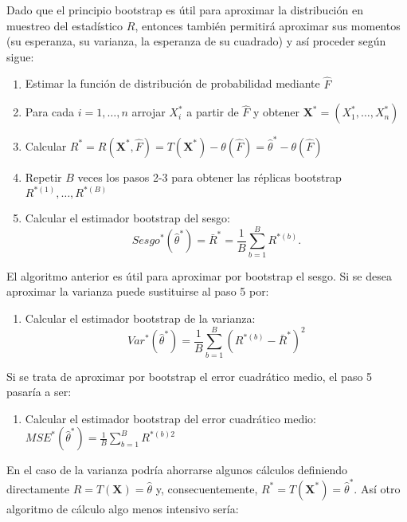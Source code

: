 \documentclass[
]{book}
\providecommand{\tightlist}{%
  \setlength{\itemsep}{0pt}\setlength{\parskip}{0pt}}
\theoremstyle{break}
\theoremstyle{definition}
\theoremstyle{definition}
\theoremstyle{definition}
\theoremstyle{remark}
\begin{document}
Dado que el principio bootstrap es útil para aproximar la distribución
en muestreo del estadístico \(R\), entonces también permitirá aproximar
sus momentos (su esperanza, su varianza, la esperanza de su cuadrado) y
así proceder según sigue:

\begin{enumerate}
\def\labelenumi{\arabic{enumi}.}
\item
  Estimar la función de distribución de probabilidad mediante \(\hat{F}\)
\item
  Para cada \(i=1,\ldots ,n\) arrojar \(X_i^{\ast}\) a partir de
  \(\hat{F}\) y obtener
  \(\mathbf{X}^{\ast}=\left( X_1^{\ast}, \ldots ,X_n^{\ast} \right)\)
\item
  Calcular \(R^{\ast}=R\left( \mathbf{X}^{\ast},\hat{F} \right) =T\left( \mathbf{X}^{\ast} \right) -\theta \left( \hat{F} \right) = \hat{\theta}^{\ast}- \theta \left( \hat{F} \right)\)
\item
  Repetir \(B\) veces los pasos 2-3 para obtener las réplicas bootstrap
  \(R^{\ast (1)}, \ldots, R^{\ast (B)}\)
\item
  Calcular el estimador bootstrap del sesgo:
  \[Sesgo^{\ast}\left( \hat{\theta}^{\ast} \right) =\bar{R}^{\ast}=\frac{1
  }{B}\sum_{b=1}^{B}R^{\ast (b)}.\]
\end{enumerate}

El algoritmo anterior es útil para aproximar por bootstrap el sesgo. Si
se desea aproximar la varianza puede sustituirse al paso 5 por:

\begin{enumerate}
\def\labelenumi{\arabic{enumi}.}
\setcounter{enumi}{4}
\tightlist
\item
  Calcular el estimador bootstrap de la varianza:
  \[Var^{\ast}\left( \hat{\theta}^{\ast} \right) =\frac{1}{B}
  \sum_{b=1}^{B}\left( R^{\ast (b)}-\bar{R}^{\ast} \right)^2\]
\end{enumerate}

Si se trata de aproximar por bootstrap el error cuadrático medio, el
paso 5 pasaría a ser:

\begin{enumerate}
\def\labelenumi{\arabic{enumi}.}
\setcounter{enumi}{4}
\tightlist
\item
  Calcular el estimador bootstrap del error cuadrático medio:
  \(MSE^{\ast}\left( \hat{\theta}^{\ast} \right) =\frac{1}{B}\sum_{b=1}^{B}R^{\ast (b) 2}\)
\end{enumerate}

En el caso de la varianza podría ahorrarse algunos cálculos definiendo
directamente \(R=T\left( \mathbf{X} \right) =\hat{\theta}\) y,
consecuentemente,
\(R^{\ast}=T\left( \mathbf{X}^{\ast} \right) = \hat{\theta}^{\ast}\). Así otro algoritmo de cálculo algo menos
intensivo sería:
\end{document}
